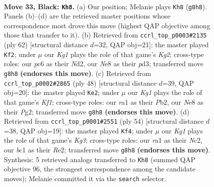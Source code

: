 \documentclass[11pt]{article}
\begin{document}
\clearpage

\begin{figure}[p]\centering
\begin{subfigure}{0.46\textwidth}\centering
\resizebox{\linewidth}{!}{%
\newchessgame
\chessboard[
  setfen={1r2n1k1/2p2p1p/p1P5/P3pp2/6b1/6P1/6K1/RNB5 b - - 1 33},
  showmover=false,
  pgfstyle=straightmove, color=movearrow, markmove={g8-h8}
]}
\caption{}
\end{subfigure}\hfill
\begin{subfigure}{0.46\textwidth}\centering
\resizebox{\linewidth}{!}{%
\newchessgame
\chessboard[
  setfen={3r4/p7/2k5/2n1pp1P/Pp6/3p1PP1/1P1N2K1/R7 w - - 0 32},
  showmover=false,
  pgfstyle=straightmove, color=movearrow, markmove={g2-f2}
]}
\caption{}
\end{subfigure}
\\[4pt]
\begin{subfigure}{0.46\textwidth}\centering
\resizebox{\linewidth}{!}{%
\newchessgame
\chessboard[
  setfen={6k1/2r1bppp/1p6/p7/3RB3/PP5P/1P3PP1/5K2 w - - 0 25},
  showmover=false,
  pgfstyle=straightmove, color=movearrow, markmove={f1-e2}
]}
\caption{}
\end{subfigure}\hfill
\begin{subfigure}{0.46\textwidth}\centering
\resizebox{\linewidth}{!}{%
\newchessgame
\chessboard[
  setfen={2r2k2/p4p2/2n5/1p1p3p/3P3P/6K1/PPN1RP2/8 w - - 0 28},
  showmover=false,
  pgfstyle=straightmove, color=movearrow, markmove={g3-f4}
]}
\caption{}
\end{subfigure}
\caption{\textbf{Move 33, Black: \texttt{Kh8}.} (a) Our position; Melanie plays \texttt{Kh8} (\texttt{g8h8}). Panels (b)--(d) are the retrieved master positions whose correspondence most drove this move (highest QAP objective among those that transfer to it). (b) Retrieved from \texttt{ccrl\_top\_p0003\#2135} (ply 62) [structural distance $d$=32, QAP obj=21]: the master played \texttt{Kf2}; under $\mu$ our \emph{Kg1} plays the role of that game's \emph{Kg2}; cross-type roles: our \emph{p}c6 as their \emph{N}d2, our \emph{N}e8 as their \emph{p}d3; transferred move \texttt{g8h8} \textbf{(endorses this move)}. (c) Retrieved from \texttt{ccrl\_top\_p0002\#2865} (ply 48) [structural distance $d$=39, QAP obj=20]: the master played \texttt{Ke2}; under $\mu$ our \emph{Kg1} plays the role of that game's \emph{Kf1}; cross-type roles: our \emph{r}a1 as their \emph{P}b2, our \emph{N}e8 as their \emph{P}g2; transferred move \texttt{g8h8} \textbf{(endorses this move)}. (d) Retrieved from \texttt{ccrl\_top\_p0001\#2551} (ply 54) [structural distance $d$=38, QAP obj=19]: the master played \texttt{Kf4}; under $\mu$ our \emph{Kg1} plays the role of that game's \emph{Kg3}; cross-type roles: our \emph{r}a1 as their \emph{N}c2, our \emph{b}c1 as their \emph{R}e2; transferred move \texttt{g8h8} \textbf{(endorses this move)}. Synthesis: 5 retrieved analogs transferred to \texttt{Kh8} (summed QAP objective 96, the strongest correspondence among the candidate moves); Melanie committed it via the \texttt{search} selector.}
\label{fig:thought-m65}
\end{figure}
\end{document}
